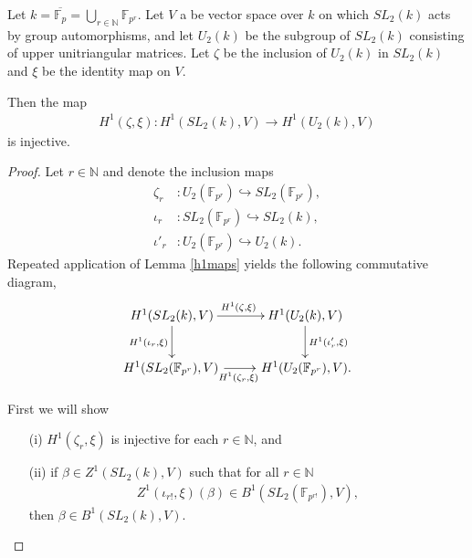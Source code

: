 \begin{example}
	Let $k = \overline{\mathbb{F}_p} = \bigcup_{r\in \mathbb{N}} \mathbb{F}_{p^r}$.
Let $V$ a be vector space over $k$ on which $SL_2(k)$ acts by group automorphisms, and let $U_2(k)$ be the subgroup of $SL_2(k)$ consisting of upper unitriangular matrices. Let $\zeta$ be the inclusion of $U_2(k)$ in $SL_2(k)$ and $\xi$ be the identity map on $V$.

Then the map
	\begin{align}
		H^1(\zeta, \xi): H^1(SL_2(k), V) \rightarrow H^1(U_2(k), V)
	\end{align}
	is injective.
\label{eg:sl2ab}
\end{example}
\begin{proof}
	Let $r \in \mathbb{N}$ and denote the inclusion maps
\begin{align*}
	\zeta_r&:U_2(\mathbb{F}_{p^r}) \hookrightarrow SL_2(\mathbb{F}_{p^r}), \\
	\iota_r&:SL_2(\mathbb{F}_{p^r}) \hookrightarrow SL_2(k), \\
	\iota'_r&:U_2(\mathbb{F}_{p^r}) \hookrightarrow U_2(k).
\end{align*}
Repeated application of Lemma \ref{h1maps} yields the following commutative diagram,
\begin{align*}
	\xymatrix{
		H^1(SL_2(k), V) \ar[r]^{H^1(\zeta, \xi)} \ar[d]_{H^1(\iota_r, \xi)} & H^1(U_2(k), V) \ar[d]^{H^1(\iota'_r, \xi)} \\
		H^1(SL_2(\mathbb{F}_{p^r}), V)\, \ar[r]_{H^1(\zeta_r, \xi)} &\, H^1(U_2(\mathbb{F}_{p^r}), V).
	}
\end{align*}

First we will show
\begin{itemize}
\item [(i)] $H^1(\zeta_r, \xi)$ is injective for each $r \in \mathbb{N}$, and
\item [(ii)] if $\beta \in Z^1(SL_2(k), V)$ such that for all $r \in \mathbb{N}$
\begin{align*} Z^1(\iota_{r!}, \xi)(\beta) \in B^1(SL_2(\mathbb{F}_{p^{r!}}), V),
\end{align*}
then $\beta \in B^1(SL_2(k), V)$.
\end{itemize}


\end{proof}
